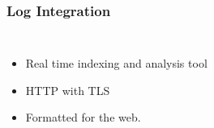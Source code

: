 \begin{frame}
\frametitle{Log Integration}

\begin{columns}
\begin{itemize}
	\item Real time indexing and analysis tool
	\item HTTP with TLS
	\item Formatted for the web.
\end{itemize}

\begin{figure}[splunk]
\end{figure}	
\end{columns}
\end{frame}
